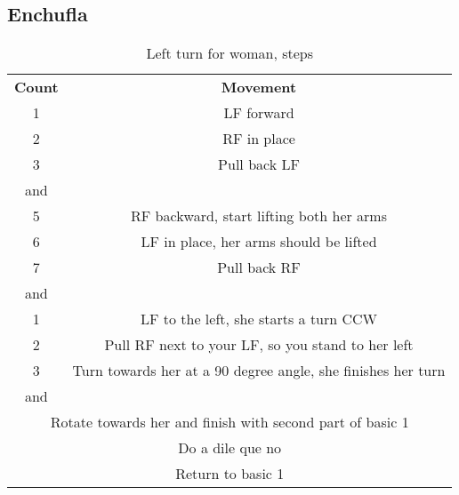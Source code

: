 \subsection{Enchufla}
\begin{table}[H]
\centering
\begin{tabular}{cc}
  \toprule
  \textbf{Count} & \textbf{Movement}\\
  \cmidrule(lr){1-1}\cmidrule(lr){2-2}
  1 & LF forward\\
  2 & RF in place\\
  3 & Pull back LF\\
  and &\\
  5 & RF backward, start lifting both her arms\\
  6 & LF in place, her arms should be lifted\\
  7 & Pull back RF\\
  and &\\
  1 & LF to the left, she starts a turn CCW\\
  2 & Pull RF next to your LF, so you stand to her left\\
  3 & Turn towards her at a 90 degree angle, she finishes her turn\\
  and &\\
  \multicolumn{2}{c}{Rotate towards her and finish with second part of basic 1}\\
  \multicolumn{2}{c}{Do a dile que no}\\
  \multicolumn{2}{c}{Return to basic 1}\\
  \bottomrule
\end{tabular}
\label{left_turn_for_woman_steps}
\caption{Left turn for woman, steps}
\end{table}


